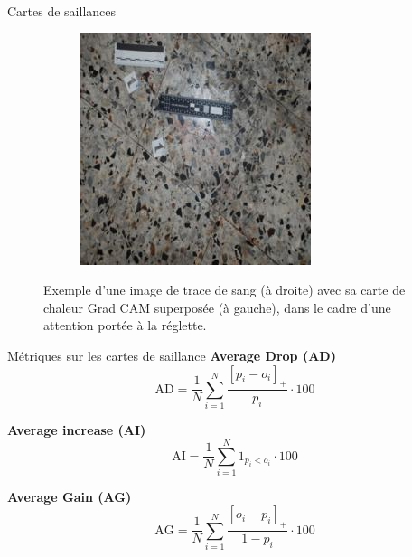 \documentclass[11pt]{beamer}
\begin{document}
\begin{frame}{Cartes de saillances}
\begin{figure}[ht]
\begin{subfigure}{0.40\textwidth}
            \includegraphics[width=\linewidth]{../asset/exemple/attention_reglette_image.jpg}
        \end{subfigure}
        \caption{Exemple d'une image de trace de sang (à droite) avec sa carte de chaleur Grad CAM superposée (à gauche), dans le cadre d'une attention portée à la réglette.}
        \label{fig:grad_cam reglette}
    \end{figure}
\end{frame}

\begin{frame}{Métriques sur les cartes de saillance}
    \textbf{Average Drop (AD)}
    \begin{equation}
        \text{AD} = \frac{1}{N} \sum_{i=1}^{N} \frac{[p_i - o_i]_+}{p_i} \cdot 100
    \end{equation}
    
    \textbf{Average increase (AI)}
    \begin{equation}
        \text{AI} = \frac{1}{N} \sum_{i=1}^{N} 1_{p_i<o_i} \cdot 100
    \end{equation}
    
    \textbf{Average Gain (AG)}
    \begin{equation}
        \text{AG} = \frac{1}{N} \sum_{i=1}^{N} \frac{[o_i - p_i]_+}{1 - p_i} \cdot 100
    \end{equation}
\end{frame}
\end{document}
